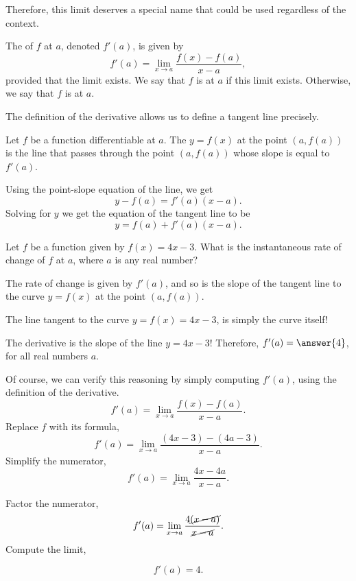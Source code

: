 \documentclass{ximera}
\begin{document}
    Therefore, this limit deserves a special name that could be used regardless of the context.
    \begin{definition}
  The  of $f$ at $a$, denoted $f'(a)$, is given by
  \[
 f'(a) = \lim_{x\to a} \frac{f(x) - f(a)}{x-a},
  \]
 provided that the limit exists. We say that $f$ is 
  at $a$ if  this limit exists. Otherwise,  we say that  $f$ is  at $a$.
\end{definition}

The definition of the derivative allows us to define a tangent line precisely.
  \begin{definition}
  Let $f$ be a function differentiable at $a$. The  $y=f(x)$ at the point $(a,f(a))$ is the line that passes through the point $(a,f(a))$ whose slope is equal to $f'(a)$.
    \end{definition}
  
 Using the point-slope equation of the line, we get
 \[y-f(a)=f'(a)(x-a).\]
Solving for $y$ we get the equation of the tangent line to be
  \[
 y = f(a)+f'(a)(x-a).
  \]

      \begin{question}
            Let $f$ be a function given by $f(x) = 4x-3$.
	What is the instantaneous rate of change of $f$ at $a$, where $a$ is any real number?
	\begin{hint}
		The rate of change is given by $f'(a)$, and so is the slope of the tangent line to the curve $y=f(x)$ at the point $(a,f(a))$.
	\end{hint}
	\begin{hint}
		The line tangent to the curve $y=f(x) = 4x-3$, is simply the curve itself!
	\end{hint}
	\begin{prompt}
		The derivative is the slope of the line $y= 4x-3$! Therefore,  $f'(a)=\answer{4}$, for all real numbers $a$.
	\end{prompt}
	\begin{hint}
		 Of course, we can verify this reasoning by simply computing $f'(a)$, using the definition of the derivative.
		 \[
 f'(a) = \lim_{x\to a} \frac{f(x) - f(a)}{x-a}.
  \]
Replace $f$ with its formula,
		\[
 f'(a) = \lim_{x\to a} \frac{(4x-3)-(4a-3)}{x-a}.
  \]
		Simplify the numerator,
			\[
 f'(a) = \lim_{x\to a} \frac{4x-4a}{x-a}.
  \]

		Factor the numerator,
		\[
 f'(a) = \lim_{x\to a} \frac{4\cancel{(x-a)}}{\cancel{x-a}}.
  \]
 Compute the limit,

		\[
 f'(a) =4.
  \]

			\end{hint}
\end{question}
\end{document}
